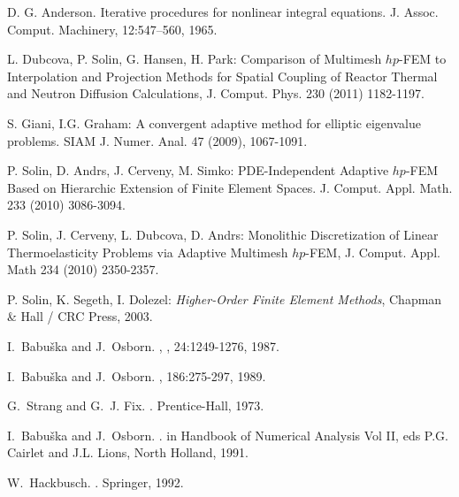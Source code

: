 \documentclass[preprint,12pt]{elsarticle}
\begin{document}
\clearpage

\begin{thebibliography}{[KLR73]}

D. G. Anderson. Iterative procedures for nonlinear integral equations. J. Assoc. Comput.
Machinery, 12:547–560, 1965.

L. Dubcova, P. Solin, G. Hansen, H. Park: Comparison of Multimesh $hp$-FEM 
to Interpolation and Projection Methods for Spatial Coupling of Reactor 
Thermal and Neutron Diffusion Calculations, J. Comput. Phys. 230 (2011) 1182-1197.

S. Giani, I.G. Graham: A convergent adaptive method for elliptic eigenvalue 
problems. SIAM J. Numer. Anal. 47 (2009), 1067-1091.

P. Solin, D. Andrs, J. Cerveny, M. Simko: 
PDE-Independent Adaptive $hp$-FEM Based on Hierarchic Extension of Finite Element Spaces.
J. Comput. Appl. Math. 233 (2010) 3086-3094.

P. Solin, J. Cerveny, L. Dubcova, D. Andrs: Monolithic Discretization of Linear 
Thermoelasticity Problems via Adaptive Multimesh $hp$-FEM, J. Comput. Appl. Math 
234 (2010) 2350-2357.

P. Solin, K. Segeth, I. Dolezel: {\em Higher-Order Finite Element Methods},
Chapman \& Hall / CRC Press, 2003.

I.~Babu\v{s}ka and J.~Osborn.
, 
, 24:1249-1276, 1987.

I.~Babu\v{s}ka and J.~Osborn.
, 
 186:275-297, 1989.
 
G.~Strang and G.~J. Fix.
.
\newblock Prentice-Hall, 1973.

I.~Babu\v{s}ka and J.~Osborn.
.
\newblock in Handbook of Numerical Analysis Vol II, eds P.G. Cairlet and J.L. Lions, North Holland, 1991.

W.~Hackbusch.
.
\newblock Springer, 1992.


\end{thebibliography}
\end{document}
